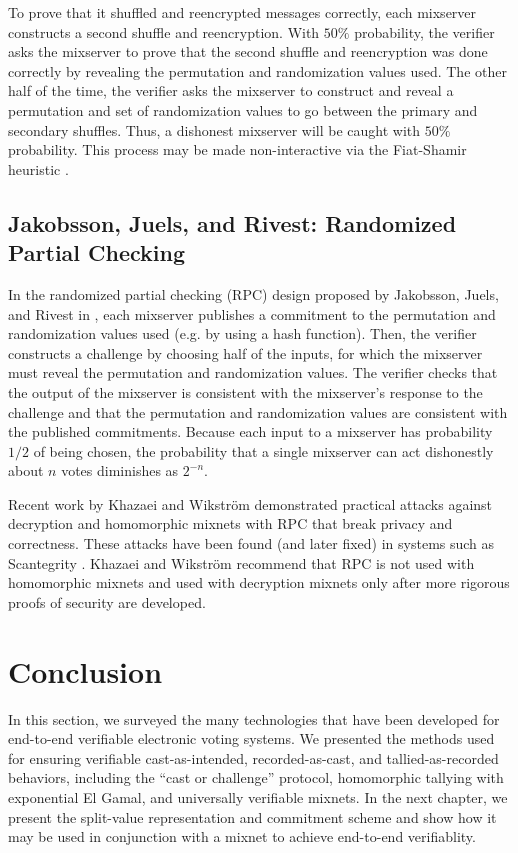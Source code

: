 To prove that it shuffled and reencrypted messages correctly, each mixserver constructs a second shuffle and reencryption. With $50\%$ probability, the verifier asks the mixserver to prove that the second shuffle and reencryption was done correctly by revealing the permutation and randomization values used. The other half of the time, the verifier asks the mixserver to construct and reveal a permutation and set of randomization values to go between the primary and secondary shuffles. Thus, a dishonest mixserver will be caught with $50\%$ probability. This process may be made non-interactive via the Fiat-Shamir heuristic \cite{fiat-shamir}.

\subsection{Jakobsson, Juels, and Rivest: Randomized Partial Checking}

In the randomized partial checking (RPC) design proposed by Jakobsson, Juels, and Rivest in \cite{jjr02}, each mixserver publishes a commitment to the permutation and randomization values used (e.g. by using a hash function). Then, the verifier constructs a challenge by choosing half of the inputs, for which the mixserver must reveal the permutation and randomization values. The verifier checks that the output of the mixserver is consistent with the mixserver's response to the challenge and that the permutation and randomization values are consistent with the published commitments. Because each input to a mixserver has probability $1/2$ of being chosen, the probability that a single mixserver can act dishonestly about $n$ votes diminishes as $2^{-n}$.

Recent work by Khazaei and Wikstr\"{o}m \cite{khazaei13} demonstrated practical attacks against decryption and homomorphic mixnets with RPC that break privacy and correctness. These attacks have been found (and later fixed) in systems such as Scantegrity \cite{scantegrity}. Khazaei and Wikstr\"{o}m recommend that RPC is not used with homomorphic mixnets and used with decryption mixnets only after more rigorous proofs of security are developed.

\section{Conclusion} \label{evote:conclusion}

In this section, we surveyed the many technologies that have been developed for end-to-end verifiable electronic voting systems. We presented the methods used for ensuring verifiable cast-as-intended, recorded-as-cast, and tallied-as-recorded behaviors, including the ``cast or challenge'' protocol, homomorphic tallying with exponential El Gamal, and universally verifiable mixnets. In the next chapter, we present the split-value representation and commitment scheme and show how it may be used in conjunction with a mixnet to achieve end-to-end verifiablity.






